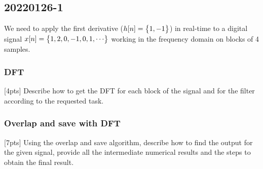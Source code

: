\pagebreak\subsection{20220126-1}
    We need to apply the first derivative ($h[n]=\begin{Bmatrix} {1,-1} \end{Bmatrix}$) in real-time to a digital signal $x[n]=\begin{Bmatrix} {1,2,0,-1,0,1,\cdots} \end{Bmatrix}$ working in the frequency domain on blocks of 4 samples.

    \subsubsection{DFT}
    [4pts] Describe how to get the DFT for each block of the signal and for the filter according to the requested task.


    \subsubsection{Overlap and save with DFT}
    [7pts] Using the overlap and save algorithm, describe how to find the output for the given signal, provide all the intermediate numerical results and the steps to obtain the final result.

